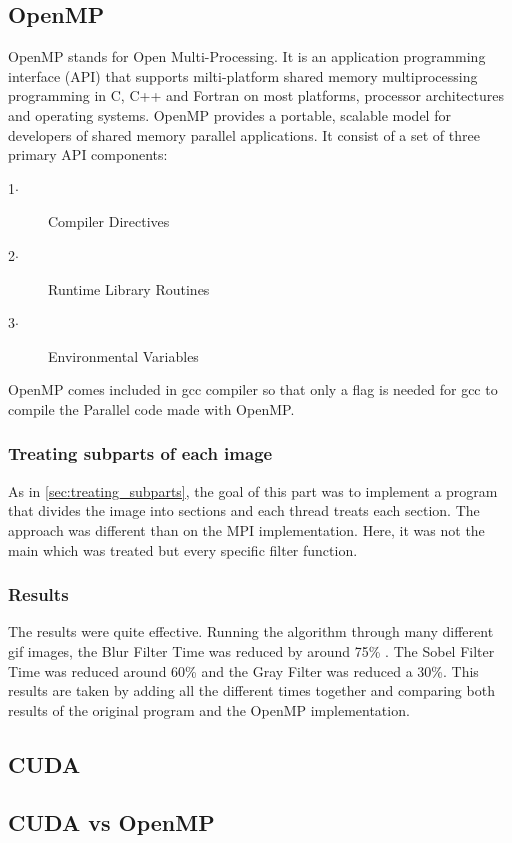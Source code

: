 \documentclass[conference,compsoc]{IEEEtran}
\begin{document}
\subsection{OpenMP} \label{sec:OpenMP}
OpenMP stands for Open Multi-Processing. It is an application programming interface (API) that supports milti-platform shared memory multiprocessing programming in C, C++ and Fortran on most platforms, processor architectures and operating systems.
OpenMP provides a portable, scalable model for developers of shared memory parallel applications.
It consist of a set of three primary API components:
\begin{description}
	\item[1$\cdot$] Compiler Directives
	\item[2$\cdot$] Runtime Library Routines
	\item[3$\cdot$] Environmental Variables
\end{description}

OpenMP comes included in gcc compiler so that only a flag is needed for gcc to compile the Parallel code made with OpenMP.

\subsubsection{Treating subparts of each image}
As in \ref{sec:treating_subparts}, the goal of this part was to implement a program that divides the image into sections and each thread treats each section. The approach was different than on the MPI implementation. Here, it was not the main which was treated but every specific filter function.

\subsubsection{Results} \label{sec:results}
The results were quite effective. Running the algorithm through many different gif images, the Blur Filter Time was reduced by around 75\% . The Sobel Filter Time was reduced around 60\% and the Gray Filter was reduced a 30\%. This results are taken by adding all the different times together and comparing both results of the original program and the OpenMP implementation.

\subsection{CUDA}\label{sec:CUDA}

\subsection{CUDA vs OpenMP}
\end{document}
